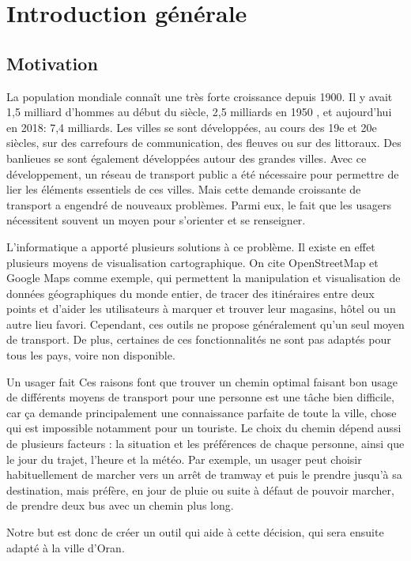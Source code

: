\chapter{Introduction générale}
	\newpage	
	\section{Motivation}
		La population mondiale connaît une très forte croissance depuis 1900. 
		Il y avait 1,5 milliard d'hommes au début du siècle, 2,5 milliards en 1950 , et aujourd'hui en 2018: 7,4 milliards. 
		Les villes se sont développées, au cours des 19e et 20e siècles, sur des carrefours de communication, des fleuves ou sur des littoraux. Des banlieues se sont également développées autour des grandes villes. 
		Avec ce développement, un réseau de transport public a été nécessaire pour permettre de lier les éléments essentiels de ces villes. 
Mais cette demande croissante de transport a engendré de nouveaux problèmes. Parmi eux, le fait que les usagers nécessitent souvent un moyen pour s'orienter et se renseigner.

L'informatique a apporté plusieurs solutions à ce problème. Il existe en effet plusieurs moyens de visualisation cartographique.
On cite OpenStreetMap et Google Maps comme exemple, qui permettent la manipulation et visualisation de données géographiques du monde entier, de tracer des itinéraires entre deux points et d'aider les utilisateurs à marquer et trouver leur magasins, hôtel ou un autre lieu favori.
Cependant, ces outils ne propose généralement qu'un seul moyen de transport. De plus, certaines de ces fonctionnalités ne sont pas adaptés pour tous les pays, voire non disponible.

Un usager fait  
Ces raisons font que trouver un chemin optimal faisant bon usage de différents moyens de transport pour une personne est une tâche bien difficile, car ça demande principalement une connaissance parfaite de toute la ville, chose qui est impossible notamment pour un touriste.
Le choix du chemin dépend aussi de plusieurs facteurs : la situation et les préférences de chaque personne, ainsi que le jour du trajet, l'heure et la météo.
Par exemple, un usager peut choisir habituellement de marcher vers un arrêt de tramway et puis le prendre jusqu'à sa destination, mais préfère, en jour de pluie ou suite à défaut de pouvoir marcher, de prendre deux bus avec un chemin plus long.

Notre but est donc de créer un outil qui aide à cette décision, qui sera ensuite adapté à la ville d’Oran.


